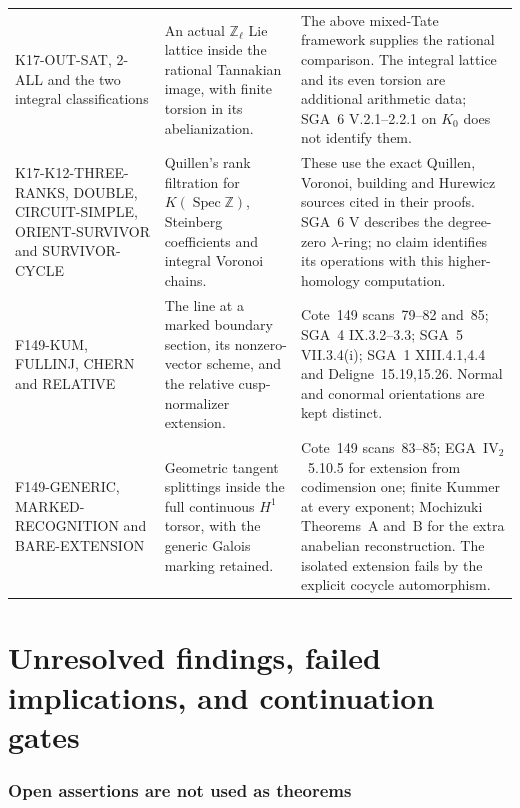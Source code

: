 \documentclass[11pt,a4paper]{article}
\theoremstyle{definition}
\begin{document}
\begin{longtable}{>{\raggedright\arraybackslash}p{}>{\raggedright\arraybackslash}p{}>{\raggedright\arraybackslash}p{}}
K17-OUT-SAT, 2-ALL and the two integral classifications &
An actual $\mathbb Z_\ell$ Lie lattice inside the rational
Tannakian image, with finite torsion in its abelianization. &
The above mixed-Tate framework supplies the rational comparison.
The integral lattice and its even torsion are additional arithmetic
data; SGA~6 V.2.1--2.2.1 on $K_0$ does not identify them.\\
K17-K12-THREE-RANKS, DOUBLE, CIRCUIT-SIMPLE,
ORIENT-SURVIVOR and SURVIVOR-CYCLE &
Quillen's rank filtration for $K(\operatorname{Spec}\mathbb Z)$,
Steinberg coefficients and integral Voronoi chains. &
These use the exact Quillen, Voronoi, building and Hurewicz sources
cited in their proofs. SGA~6 V describes the degree-zero
$\lambda$-ring; no claim identifies its operations with this
higher-homology computation.\\
F149-KUM, FULLINJ, CHERN and RELATIVE &
The line at a marked boundary section, its nonzero-vector scheme,
and the relative cusp-normalizer extension. &
Cote~149 scans~79--82 and~85; SGA~4 IX.3.2--3.3;
SGA~5 VII.3.4(i); SGA~1 XIII.4.1,4.4 and Deligne~15.19,15.26.
Normal and conormal orientations are kept distinct.\\
F149-GENERIC, MARKED-RECOGNITION and BARE-EXTENSION &
Geometric tangent splittings inside the full continuous
$H^1$ torsor, with the generic Galois marking retained. &
Cote~149 scans~83--85; EGA~$\mathrm{IV}_2$~5.10.5 for extension
from codimension one; finite Kummer at every exponent;
Mochizuki Theorems~A and~B for the extra anabelian reconstruction.
The isolated extension fails by the explicit cocycle automorphism.\\
\bottomrule
\end{longtable}
\normalsize



\clearpage
\part{Unresolved findings, failed implications, and continuation gates}
\section{Open assertions are not used as theorems}
\end{document}

